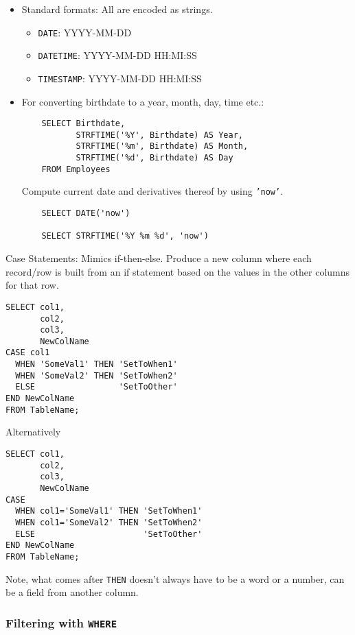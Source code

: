 \documentclass[12pt]{article}
\theoremstyle{plain}
\theoremstyle{definition}
\theoremstyle{remark}
\begin{document}
\begin{itemize}
  \item
    Standard formats:
    All are encoded as strings.
    \begin{itemize}
      \item \texttt{DATE}: YYYY-MM-DD
      \item \texttt{DATETIME}: YYYY-MM-DD HH:MI:SS
      \item \texttt{TIMESTAMP}: YYYY-MM-DD HH:MI:SS
    \end{itemize}

  \item
    For converting birthdate to a year, month, day, time etc.:
    \begin{lstlisting}
    SELECT Birthdate,
           STRFTIME('%Y', Birthdate) AS Year,
           STRFTIME('%m', Birthdate) AS Month,
           STRFTIME('%d', Birthdate) AS Day
    FROM Employees
    \end{lstlisting}
    Compute current date and derivatives thereof
    by using \texttt{'now'}.
    \begin{lstlisting}
    SELECT DATE('now')

    SELECT STRFTIME('%Y %m %d', 'now')
    \end{lstlisting}
\end{itemize}
Case Statements:
Mimics if-then-else.
Produce a new column where each record/row is built from an if
statement based on the values in the other columns for that row.
\begin{lstlisting}
SELECT col1,
       col2,
       col3,
       NewColName
CASE col1
  WHEN 'SomeVal1' THEN 'SetToWhen1'
  WHEN 'SomeVal2' THEN 'SetToWhen2'
  ELSE                 'SetToOther'
END NewColName
FROM TableName;
\end{lstlisting}
Alternatively
\begin{lstlisting}
SELECT col1,
       col2,
       col3,
       NewColName
CASE
  WHEN col1='SomeVal1' THEN 'SetToWhen1'
  WHEN col1='SomeVal2' THEN 'SetToWhen2'
  ELSE                      'SetToOther'
END NewColName
FROM TableName;
\end{lstlisting}
Note, what comes after \texttt{THEN} doesn't always have to be a
word or a number, can be a field from another column.



\clearpage
\subsubsection{Filtering with \texttt{WHERE}}
\end{document}
